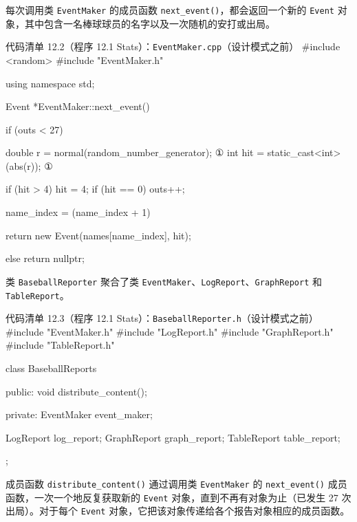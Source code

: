 每次调用类 \texttt{Event\allowbreak{}Maker} 的成员函数 \texttt{next\_\allowbreak{}event(\allowbreak{})\allowbreak{}}，都会返回一个新的 \texttt{Event} 对象，其中包含一名棒球球员的名字以及一次随机的安打或出局。

\begin{codeboxt}{代码清单 12.2（程序 12.1 Stats）：\texttt{Event\allowbreak{}Maker.\allowbreak{}cpp}（设计模式之前）}
#include <random>
#include "EventMaker.h"

using namespace std;

Event *EventMaker::next_event()
{
    if (outs < 27)
    {
        double r   = normal(random_number_generator);  ①
        int    hit = static_cast<int>(abs(r));         ①

        if (hit > 4) hit = 4;
        if (hit == 0) outs++;

        name_index = (name_index + 1)%

        return new Event(names[name_index], hit);
    }
    else return nullptr;
}
\end{codeboxt}
\par

类 \texttt{Baseball\allowbreak{}Reporter} 聚合了类 \texttt{Event\allowbreak{}Maker}、\texttt{LogReport}、\texttt{Graph\allowbreak{}Report} 和 \texttt{Table\allowbreak{}Report}。

\begin{codeboxt}{代码清单 12.3（程序 12.1 Stats）：\texttt{Baseball\allowbreak{}Reporter.\allowbreak{}h}（设计模式之前）}
#include "EventMaker.h"
#include "LogReport.h"
#include "GraphReport.h"
#include "TableReport.h"

class BaseballReports
{
public:
    void distribute_content();

private:
    EventMaker event_maker;

    LogReport   log_report;
    GraphReport graph_report;
    TableReport table_report;
};
\end{codeboxt}

成员函数 \texttt{distribute\_\allowbreak{}content(\allowbreak{})\allowbreak{}} 通过调用类 \texttt{Event\allowbreak{}Maker} 的 \texttt{next\_\allowbreak{}event(\allowbreak{})\allowbreak{}} 成员函数，一次一个地反复获取新的 \texttt{Event} 对象，直到不再有对象为止（已发生 27 次出局）。对于每个 \texttt{Event} 对象，它把该对象传递给各个报告对象相应的成员函数。

